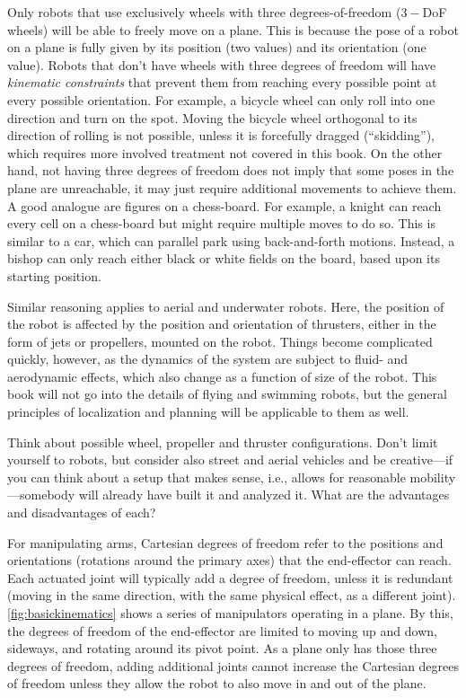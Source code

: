 Only robots that use exclusively wheels with three degrees-of-freedom ($3-$DoF wheels) will be able to freely move on a plane. This is because the pose of a robot on a plane is fully given by its position (two values) and its orientation (one value). Robots that don't have wheels with three degrees of freedom will have \textsl{kinematic constraints} that prevent them from reaching every possible point at every possible orientation. For example, a bicycle wheel can only roll into one direction and turn on the spot. Moving the bicycle wheel orthogonal to its direction of rolling is not possible, unless it is forcefully dragged (``skidding''), which requires more involved treatment not covered in this book. On the other hand, not having three degrees of freedom does not imply that some poses in the plane are unreachable, it may just require additional movements to achieve them.
A good analogue are figures on a chess-board. For example, a knight can reach every cell on a chess-board but might require multiple moves to do so. This is similar to a car, which can parallel park using back-and-forth motions. Instead, a bishop can only reach either black or white fields on the board, based upon its starting position.

Similar reasoning applies to aerial and underwater robots. Here, the position of the robot is affected by the position and orientation of thrusters, either in the form of jets or propellers, mounted on the robot. Things become complicated quickly, however, as the dynamics of the system are subject to fluid- and aerodynamic effects, which also change as a function of size of the robot. This book will not go into the details of flying and swimming robots, but the general principles of localization and planning will be applicable to them as well.

\begin{mdframed}Think about possible wheel, propeller and thruster configurations. Don't limit yourself to robots, but consider also street and aerial vehicles and be creative---if you can think about a setup that makes sense, i.e., allows for reasonable mobility---somebody will already have built it and analyzed it. What are the advantages and disadvantages of each?
\end{mdframed}

For manipulating arms, Cartesian degrees of freedom refer to the positions and orientations (rotations around the primary axes) that the end-effector can reach. Each actuated joint will typically add a degree of freedom, unless it is redundant (moving in the same direction, with the same physical effect, as a different joint). \cref{fig:basickinematics} shows a series of manipulators operating in a plane. By this, the degrees of freedom of the end-effector are limited to moving up and down, sideways, and rotating around its pivot point. As a plane only has those three degrees of freedom, adding additional joints cannot increase the Cartesian degrees of freedom unless they allow the robot to also move in and out of the plane.

